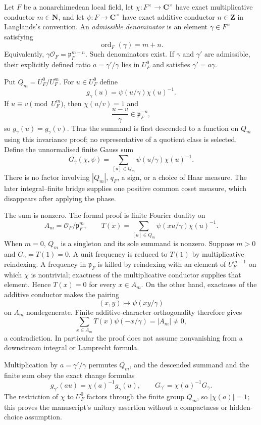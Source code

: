 \begin{definition}\label{mod:delta-finitedefinition}
Let $F$ be a nonarchimedean local field, let
$\chi:F^\times\to\mathbf C^\times$ have exact multiplicative conductor
$m\in\mathbf N$, and let $\psi:F\to\mathbf C^\times$ have exact additive
conductor $n\in\mathbf Z$ in Langlands's convention.  An
\emph{admissible denominator} is an element $\gamma\in F^\times$ satisfying
\[
 \operatorname{ord}_F(\gamma)=m+n.
\]
Equivalently,
$\gamma\mathcal O_F=\mathfrak p_F^{m+n}$.  Such denominators exist.  If
$\gamma$ and $\gamma'$ are admissible, their explicitly defined ratio
$a=\gamma'/\gamma$ lies in $U_F^0$ and satisfies $\gamma'=a\gamma$.

Put $Q_m=U_F^0/U_F^m$.  For $u\in U_F^0$ define
\[
 g_\gamma(u)=\psi(u/\gamma)\chi(u)^{-1}.
\]
If $u\equiv v\pmod {U_F^m}$, then $\chi(u/v)=1$ and
\[
 \frac{u-v}{\gamma}\in\mathfrak p_F^{-n},
\]
so $g_\gamma(u)=g_\gamma(v)$.  Thus the summand is first descended to a
function on $Q_m$ using this invariance proof; no representative of a
quotient class is selected.  Define the unnormalised finite Gauss sum
\[
 G_\gamma(\chi,\psi)
   =\sum_{[u]\in Q_m}\psi(u/\gamma)\chi(u)^{-1}.
\]
There is no factor involving $|Q_m|$, $q_F$, a sign, or a choice of Haar
measure.  The later integral--finite bridge supplies one positive common
coset measure, which disappears after applying the phase.

The sum is nonzero.  The formal proof is finite Fourier duality on
\[
 A_m=\mathcal O_F/\mathfrak p_F^m,
 \qquad
 T(x)=\sum_{[u]\in Q_m}\psi(xu/\gamma)\chi(u)^{-1}.
\]
When $m=0$, $Q_m$ is a singleton and its sole summand is nonzero.  Suppose
$m>0$ and $G_\gamma=T(1)=0$.  A unit frequency is reduced to $T(1)$ by
multiplicative reindexing.  A frequency in $\mathfrak p_F$ is killed by
reindexing with an element of $U_F^{m-1}$ on which $\chi$ is nontrivial;
exactness of the multiplicative conductor supplies that element.  Hence
$T(x)=0$ for every $x\in A_m$.  On the other hand, exactness of the additive
conductor makes the pairing
\[
 (x,y)\longmapsto\psi(xy/\gamma)
\]
on $A_m$ nondegenerate.  Finite additive-character orthogonality therefore
gives
\[
 \sum_{x\in A_m}T(x)\psi(-x/\gamma)=|A_m|\ne0,
\]
a contradiction.  In particular the proof does not assume nonvanishing
from a downstream integral or Lamprecht formula.

Multiplication by $a=\gamma'/\gamma$ permutes $Q_m$, and the descended
summand and the finite sum obey the exact change formulas
\[
 g_{\gamma'}(au)=\chi(a)^{-1}g_\gamma(u),
 \qquad
 G_{\gamma'}=\chi(a)^{-1}G_\gamma.
\]
The restriction of $\chi$ to $U_F^0$ factors through the finite group
$Q_m$, so $|\chi(a)|=1$; this proves the manuscript's unitary assertion
without a compactness or hidden-choice assumption.


\end{definition}
